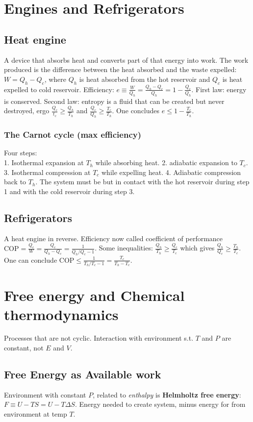 \documentclass[11pt,twocolumn]{amsart}
\begin{document}
\section{Engines and Refrigerators}
\subsection{Heat engine} A device that absorbs heat and converts part of that energy into work. The work produced is the difference between the heat absorbed and the waste expelled: $W = Q_h-Q_c$, where $Q_h$ is heat absorbed from the hot reservoir and $Q_c$ is heat expelled to cold reservoir. Efficiency: $e \equiv \frac{W}{Q_h} = \frac{Q_h-Q_c}{Q_h} = 1 - \frac{Q_c}{Q_h}$. First law: energy is conserved. Second law: entropy is a fluid that can be created but never destroyed, ergo $\frac{Q_c}{t_c} \geq \frac{Q_h}{T_h}$ and $\frac{Q_c}{Q_h} \geq \frac{T_c}{T_h}$. One concludes $e \leq 1 - \frac{T_c}{T_h}$.
\subsubsection{The Carnot cycle (max efficiency)} Four steps:\\1. Isothermal expansion at $T_h$ while absorbing heat. 2. adiabatic expansion to $T_c$. 3. Isothermal compression at $T_c$ while expelling heat. 4. Adiabatic compression back to $T_h$. The system must be but in contact with the hot reservoir during step 1 and with the cold reservoir during step 3.
\subsection{Refrigerators} A heat engine in reverse. Efficiency now called coefficient of performance $\text{COP}=\frac{Q_c}{W}=\frac{Q_c}{Q_h-Q_c} = \frac{1}{Q_h/Q_c -1}$. Some inequalities: $\frac{Q_h}{T_h} \geq \frac{Q_c}{T_c}$ which gives $\frac{Q_h}{Q_c} \geq \frac{T_h}{T_c}$. One can conclude $\text{COP} \leq \frac{1}{T_h/T_c -1} =\frac{T_c}{T_h - T_c}$.

\section{Free energy and Chemical thermodynamics}
Processes that are not cyclic. Interaction with environment s.t. $T$ and $P$ are constant, not $E$ and $V$.

\subsection{Free Energy as Available work}
Environment with constant $P$, related to \emph{enthalpy} is \textbf{Helmholtz free energy}: $F \equiv U - TS = U - T\Delta S$. Energy needed to create system, minus energy for from environment at temp $T$. 
\end{document}

